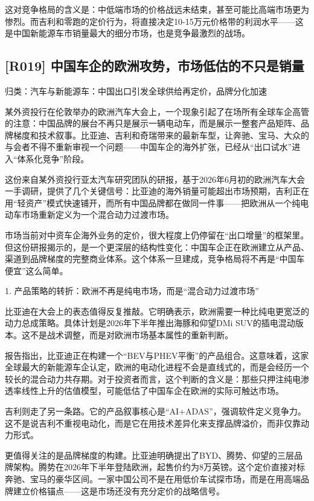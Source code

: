 \documentclass[11pt]{ctexart}
\begin{document}
这对竞争格局的含义是：中低端市场的价格战远未结束，甚至可能比高端市场更为惨烈。而吉利和零跑的定价行为，将直接决定10-15万元价格带的利润水平——这是中国新能源车市销量最大的细分市场，也是竞争最激烈的战场。

\subsection{[R019] 中国车企的欧洲攻势，市场低估的不只是销量}
{\small\color{refgray}归类：汽车与新能源车：中国出口引发全球供给再定价，品牌分化加速}

某外资投行在伦敦举办的欧洲汽车大会上，一个现象引起了在场所有全球车企高管的注意：中国品牌的展台不再只是展示一辆电动车，而是展示一整套产品矩阵、品牌梯度和技术叙事。比亚迪、吉利和奇瑞带来的最新车型，让奔驰、宝马、大众的与会者不得不重新审视一个问题——中国车企的海外扩张，已经从“出口试水”进入“体系化竞争”阶段。

这份来自某外资投行亚太汽车研究团队的研报，基于2026年6月初的欧洲汽车大会一手调研，提供了几个关键信号：比亚迪的海外销量可能超出市场预期，吉利正在用“轻资产”模式快速铺开，而所有中国品牌都在做同一件事——把欧洲从一个纯电动车市场重新定义为一个混合动力过渡市场。

市场当前对中资车企海外业务的定价，很大程度上仍停留在“出口增量”的框架里。但这份研报揭示的，是一个更深层的结构性变化：中国车企正在欧洲建立从产品、渠道到品牌梯度的完整商业体系。这个体系一旦建成，竞争格局将不再是“中国车便宜”这么简单。

1. 产品策略的转折：欧洲不再是纯电市场，而是“混合动力过渡市场”

比亚迪在大会上的表态值得反复推敲。它明确表示，欧洲需要一种比纯电更宽泛的动力总成策略。具体计划是2026年下半年推出海豚和仰望DMi SUV的插电混动版本。这不是战术调整，而是对欧洲市场基本属性的重新判断。

报告指出，比亚迪正在构建一个“BEV与PHEV平衡”的产品组合。这意味着，这家全球最大的新能源车企认定，欧洲的电动化进程不会是直线式的，而是会经历一个较长的混合动力共存期。对于投资者而言，这个判断的含义是：那些只押注纯电渗透率线性上升的估值模型，可能低估了中国车企在欧洲的实际可触达市场。

吉利则走了另一条路。它的产品叙事核心是“AI+ADAS”，强调软件定义竞争力。这不是说吉利不重视电动化，而是它在用技术差异化来支撑品牌溢价，而非仅靠动力形式。

更值得关注的是品牌梯度的构建。比亚迪明确提出了BYD、腾势、仰望的三层品牌架构。腾势在2026年下半年登陆欧洲，起售价约为8万英镑。这个定价直接对标奔驰、宝马的豪华区间。一家中国公司不是在用低价车试探市场，而是在用高端品牌建立价格锚点——这是市场还没有充分定价的战略信号。
\end{document}
